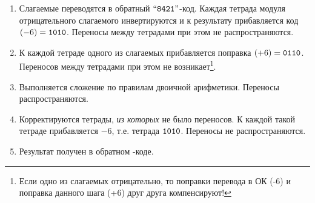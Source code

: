 \begin{enumerate}
    \item Слагаемые переводятся в обратный $\text{``\texttt{8421}''}$-код. Каждая тетрада модуля отрицательного слагаемого инвертируются и к результату прибавляется код $(-6)=\texttt{1010}$. Переносы между тетрадами при этом не распространяются.
    \item К каждой тетраде одного из слагаемых прибавляется поправка $(+6)=\texttt{0110}$. Переносов между тетрадами при этом не возникает\footnote{Если одно из слагаемых отрицательно, то поправки перевода в ОК (-6) и поправка данного шага (+6) друг друга компенсируют!}.
    \item Выполняется сложение по правилам двоичной арифметики. Переносы распространяются.
    \item Корректируются тетрады, \emph{из которых} не было переносов. К каждой такой тетраде прибавляется $-6$, т.е. тетрада $\texttt{1010}$. Переносы не распространяются.
    \item Результат получен в обратном \NaturalLabel-коде.
\end{enumerate}


